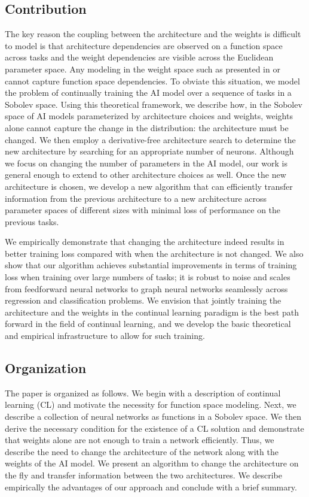 \subsection{Contribution}
The key reason the coupling between the architecture and the weights is difficult to model is that architecture dependencies are observed on a function space across tasks and the weight dependencies are visible across the Euclidean parameter space. Any modeling in the weight space such as presented in \cite{chakraborty2025understanding, raghavan2021formalizing} or \cite{lu2025rethinking} cannot capture function space dependencies. To obviate this situation, we model the problem of continually training the AI model over a sequence of tasks in a Sobolev space. Using this theoretical framework, we describe how, in the Sobolev space of AI models parameterized by architecture choices and  weights, weights alone cannot capture the change in the distribution:  the architecture must be changed. We then employ a derivative-free architecture search  to determine the new architecture by searching for an appropriate number of neurons.  Although we focus on changing the number of parameters in the AI model, our work is general enough to extend to other architecture choices as well. Once the new architecture is chosen, we develop a new algorithm that can efficiently transfer information from the previous architecture to a new architecture across parameter spaces of different sizes with minimal loss of performance on the previous tasks.

We  empirically demonstrate that changing the architecture indeed results in better training loss compared with when the architecture is not changed. We also show that our algorithm achieves substantial improvements in terms of training loss when training over large numbers of tasks; it is robust to noise and scales from feedforward neural networks to graph neural networks seamlessly across regression and classification problems. We envision that jointly training the architecture and the weights in the continual learning paradigm is the best path forward in the field of continual learning, and we develop the basic theoretical and empirical infrastructure to allow for such training. 


\subsection{Organization}
The paper is organized as follows. We begin with a description of continual learning (CL) and motivate the necessity for function space modeling. Next, we describe a collection of neural networks as functions in a Sobolev space. We then derive the necessary condition for the existence of a CL solution and demonstrate that weights alone are not enough to train a network efficiently. Thus, we describe the need to change the architecture of the network along with the weights of the AI model. We  present an algorithm to change the architecture on the fly and transfer information between the two architectures. We describe empirically the advantages of our approach and conclude with a brief summary. 


